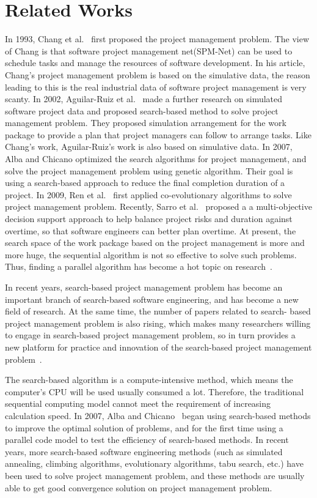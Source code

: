 
\section{Related Works}
%
In 1993, Chang et al.~\cite{chang} first proposed the project management problem. The view of 
Chang is that software project management net(SPM-Net) can be used to 
schedule tasks and manage the resources of software development. 
In his article, Chang's project management problem is based on the simulative 
data, the reason leading to this is the real industrial data of software 
project management is very scanty. In 2002, Aguilar-Ruiz et al.~\cite{alba} made a 
further research on simulated software project data and proposed search-based 
method to solve project management problem. They proposed 
simulation arrangement for the work package to provide a plan that project 
managers can follow to arrange tasks. Like Chang's work, Aguilar-Ruiz's work 
is also based on simulative data. In 2007, Alba and Chicano optimized the 
search algorithms for project management, and solve the project management 
problem using genetic algorithm. Their goal is using a search-based approach 
to reduce the final completion duration of a project. In 2009, Ren et al.~\cite{ren} first 
applied co-evolutionary algorithms to solve project management problem. 
Recently, Sarro et al.~\cite{sarro} proposed a a multi-objective decision support approach to help
balance project risks and duration against overtime, so that software
engineers can better plan overtime. 
At present, the search space of the work package based on the project 
management is more and more huge, the sequential algorithm is not so 
effective to solve such problems. Thus, finding a parallel algorithm has 
become a hot topic on research~\cite{pentico}.


In recent years, search-based project management problem has become an 
important branch of search-based software engineering, and has become a new 
field of research. At the same time, the number of papers related to search-
based project management problem is also rising, which makes many researchers 
willing to engage in search-based project management problem, so in turn 
provides a new platform for practice and innovation of the search-based 
project management problem~\cite{penta}.


The search-based algorithm is a compute-intensive method, which means the
computer's CPU will be used usually consumed a lot. Therefore, the traditional
sequential computing model cannot meet the requirement of increasing calculation
speed. In 2007, Alba and Chicano~\cite{pospichal} began using search-based methods to improve the
optimal solution of problems, and for the first time using a parallel code model
to test the efficiency of search-based methods. In recent
years, more search-based software engineering methods (such as simulated
annealing, climbing algorithms, evolutionary algorithms, tabu search, etc.) have
been used to solve project management problem, and these methods are usually
able to get good convergence solution on project management problem.

